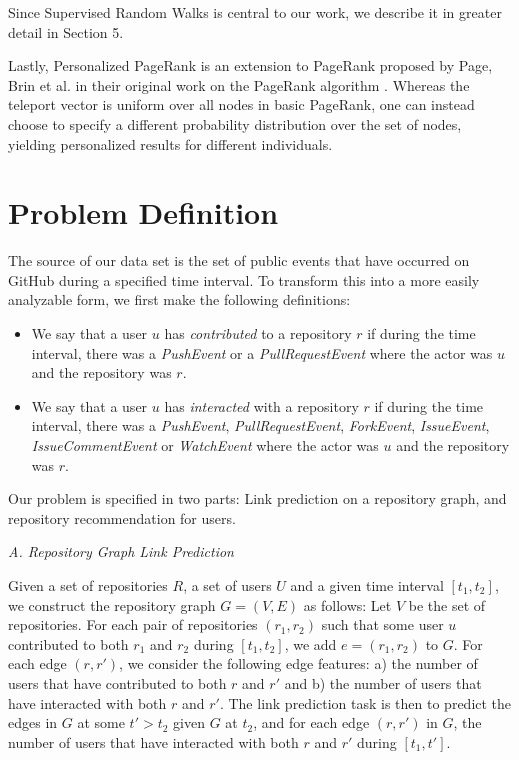 \documentclass[10pt]{article}
\begin{document}
\begin{multicols}{2}
Since Supervised Random Walks is central to our work, we describe it in greater detail in Section 5.

Lastly, Personalized PageRank is an extension to PageRank proposed by Page, Brin et al. in their original work on the PageRank algorithm \cite{page}. Whereas the teleport vector is uniform over all nodes in basic PageRank, one can instead choose to specify a different probability distribution over the set of nodes, yielding personalized results for different individuals.

\section{Problem Definition}

The source of our data set is the set of public events that have occurred on GitHub during a specified time interval. To transform this into a more easily analyzable form, we first make the following definitions:

\begin{itemize}
\item We say that a user $u$ has \textit{contributed} to a repository $r$ if during the time interval, there was a \textit{PushEvent} or a \textit{PullRequestEvent} where the actor was $u$ and the repository was $r$.
\item We say that a user $u$ has \textit{interacted} with a repository $r$ if during the time interval, there was a \textit{PushEvent}, \textit{PullRequestEvent}, \textit{ForkEvent}, \textit{IssueEvent}, \textit{IssueCommentEvent} or \textit{WatchEvent} where the actor was $u$ and the repository was $r$.
\end{itemize}

Our problem is specified in two parts: Link prediction on a repository graph, and repository recommendation for users.

\textit{A. Repository Graph Link Prediction}

Given a set of repositories $R$, a set of users $U$ and a given time interval $[t_1, t_2]$, we construct the repository graph $G = (V, E)$ as follows: Let $V$ be the set of repositories. For each pair of repositories $(r_1, r_2)$ such that some user $u$ contributed to both $r_1$ and $r_2$ during $[t_1, t_2]$, we add $e = (r_1, r_2)$ to $G$. For each edge $(r, r')$, we consider the following edge features: a) the number of users that have contributed to both $r$ and $r'$ and b) the number of users that have interacted with both $r$ and $r'$. The link prediction task is then to predict the edges in $G$ at some $t' > t_2$ given $G$ at $t_2$, and for each edge $(r, r')$ in $G$, the number of users that have interacted with both $r$ and $r'$ during $[t_1, t']$.


\end{multicols}
\end{document}
